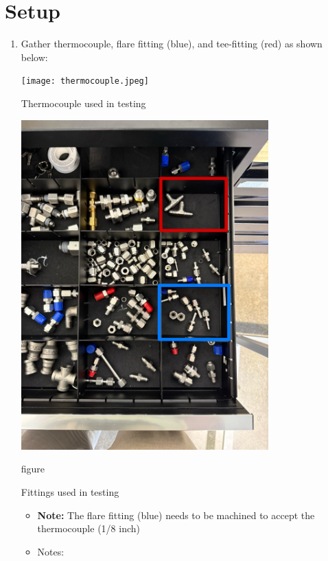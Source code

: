 \documentclass[11pt]{article}
\begin{document}
    \newpage

    \section{Setup}
        \begin{enumerate}
            \item Gather thermocouple, flare fitting (blue), and tee-fitting (red) as shown below: \\
            \begin{minipage}{0.45\textwidth}
                \vspace*{1em}
                \texttt{[image: thermocouple.jpeg]}
                \captionsetup{type=figure}
                \caption{Thermocouple used in testing}
            \end{minipage}
            \hfill
            \begin{minipage}{0.45\textwidth}
                \vspace*{1em}
                \includegraphics[width=0.75\textwidth, angle=90]{fluid_fittings.jpeg}
                \captionsetup{type=figure}
                \caption{figure}{Fittings used in testing}
            \end{minipage}
            \begin{itemize}
                \item \textbf{Note:} The flare fitting (blue) needs to be machined to accept the thermocouple (1/8 inch)
                \item Notes: 
            \end{itemize}


\end{enumerate}
\end{document}
